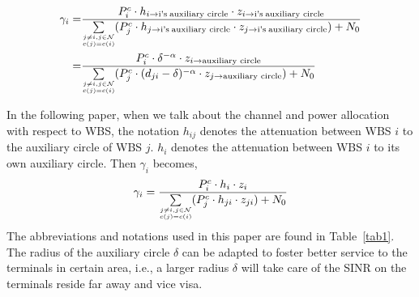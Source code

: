 \documentclass[times]{ettauth}
\newcommand{\ie}{i.e., }
\theoremstyle{mytheoremstyle}
\theoremstyle{mytheoremstyle}
\theoremstyle{mytheoremstyle}
\begin{document}
\begin{equation}
\label{quasiSINR}
\begin{aligned}
 \gamma_{i} = &\frac{P_{i}^c \cdot h_{i\rightarrow \text{i's}\hspace{0.2em} \text{auxiliary circle}}\cdot z_{i\rightarrow \text{i's}\hspace{0.2em}\text{auxiliary circle}}} {\sum\limits_{\tiny\substack{j\neq i, j\in \mathcal{N}\\c(j)=c(i)}} (P_j^c \cdot h_{j\rightarrow \text{i's}\hspace{0.2em} \text{auxiliary circle}} \cdot z_{j\rightarrow \text{i's}\hspace{0.2em} \text{auxiliary circle}}) + N_0}\\
 = & \frac{P_{i}^c \cdot \delta^{-\alpha}\cdot z_{i\rightarrow \text{auxiliary circle}}} {\sum\limits_{\tiny\substack{j\neq i, j\in \mathcal{N}\\c(j)=c(i)}} (P_j^c \cdot (d_{ji}-\delta)^{-\alpha} \cdot z_{j\rightarrow \text{auxiliary circle}}) + N_0}
\end{aligned}
\end{equation}

In the following paper, when we talk about the channel and power allocation with respect to WBS, the notation $h_{ij}$ denotes the attenuation between WBS $i$ to the auxiliary circle of WBS $j$.
$h_{i}$ denotes the attenuation between WBS $i$ to its own auxiliary circle.
Then $\gamma_i$ becomes,
\begin{equation}
\label{quasiSINR_2}
\begin{aligned}
 \gamma_{i} = 
  \frac{P_{i}^c \cdot h_i\cdot z_i} {\sum\limits_{\tiny\substack{j\neq i, j\in \mathcal{N}\\c(j)=c(i)}} (P_j^c \cdot h_{ji} \cdot z_{ji}) + N_0}
\end{aligned}
\end{equation}
The abbreviations and notations used in this paper are found in Table~\ref{tab1}.
%
The radius of the auxiliary circle $\delta$ can be adapted to foster better service to the terminals in certain area, \ie a larger radius $\delta$ will take care of the SINR on the terminals reside far away and vice visa.
\end{document}
